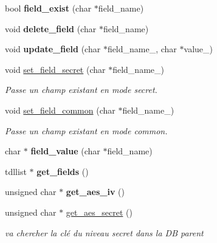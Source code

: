 \begin{DoxyCompactItemize}
bool {\bfseries field\+\_\+exist} (char $\ast$field\+\_\+name)
\item 
\mbox{\label{classt__secret__item_a9151272a45de37d5e233f1ef30664f07}} 
void {\bfseries delete\+\_\+field} (char $\ast$field\+\_\+name)
\item 
\mbox{\label{classt__secret__item_ad07ac56e5e627496cf7f33f95800c97f}} 
void {\bfseries update\+\_\+field} (char $\ast$field\+\_\+name\+\_\+, char $\ast$value\+\_\+)
\item 
void \hyperlink{classt__secret__item_a89e00d254657bdb437e8b84a668f4a61}{set\+\_\+field\+\_\+secret} (char $\ast$field\+\_\+name\+\_\+)
\begin{DoxyCompactList}\small\item\em Passe un champ existant en mode \textquotesingle{}secret\textquotesingle{}. \end{DoxyCompactList}\item 
void \hyperlink{classt__secret__item_aee6a52cf571677103cf279eb833de11f}{set\+\_\+field\+\_\+common} (char $\ast$field\+\_\+name\+\_\+)
\begin{DoxyCompactList}\small\item\em Passe un champ existant en mode \textquotesingle{}common\textquotesingle{}. \end{DoxyCompactList}\item 
\mbox{\label{classt__secret__item_ae5686640f80707a7ca693c842a6321f0}} 
char $\ast$ {\bfseries field\+\_\+value} (char $\ast$field\+\_\+name)
\item 
\mbox{\label{classt__secret__item_a8961f94b5472aded6b141b59cee19fe3}} 
tdllist $\ast$ {\bfseries get\+\_\+fields} ()
\item 
\mbox{\label{classt__secret__item_aacc3fa697f6ad1862f0f7ad6f17b3be4}} 
unsigned char $\ast$ {\bfseries get\+\_\+aes\+\_\+iv} ()
\item 
unsigned char $\ast$ \hyperlink{classt__secret__item_a39ecb24957d5ca0156194e38860c5250}{get\+\_\+aes\+\_\+secret} ()
\begin{DoxyCompactList}\small\item\em va chercher la clé du niveau secret dans la DB parent \end{DoxyCompactList}\end{DoxyCompactItemize}
